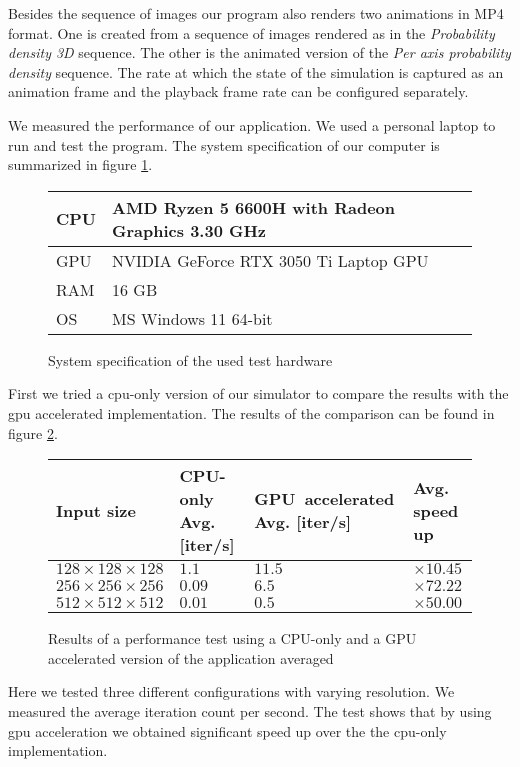 Besides the sequence of images our program also renders two animations in MP4 format.
One is created from a sequence of images rendered as in the \textit{Probability density 3D} sequence.
The other is the animated version of the \textit{Per axis probability density} sequence.
The rate at which the state of the simulation is captured as an animation frame and the playback frame rate can be configured separately.

We measured the performance of our application.
We used a personal laptop to run and test the program.
The system specification of our computer is summarized in figure \ref{fig:system_spec}.
\begin{figure}
	\begin{center}
		\begin{tabular}{|m{5em}||m{25em}|}
			\hline
			CPU & AMD Ryzen 5 6600H with Radeon Graphics            3.30 GHz\\
			\hline
			GPU & NVIDIA GeForce RTX 3050 Ti Laptop GPU\\		
			\hline
			RAM & 16 GB\\		
			\hline
			OS & MS Windows 11 64-bit\\		
			\hline
		\end{tabular}
		\caption{System specification of the used test hardware}
		\label{fig:system_spec}
	\end{center}
\end{figure}
First we tried a \acrshort{cpu}-only version of our simulator to compare the results with the \acrshort{gpu} accelerated implementation.
The results of the comparison can be found in figure \ref{fig:performance_test}.
\begin{figure}
	\begin{center}
	\begin{tabular}{|m{8em}||m{8em}| m{8em}| m{4em}|}
		\hline
		Input size & CPU-only Avg. [iter/s] & GPU~accelerated Avg. [iter/s] & Avg. speed up\\
		\hline
		$128 \times 128 \times 128$ & $1.1$ & $11.5$ & $\times 10.45$\\
		\hline
		$256 \times 256 \times 256$ & $0.09$ & $6.5$ & $\times 72.22$\\
		\hline
		$512 \times 512 \times 512$ & $0.01$ & $0.5$ & $\times 50.00$\\
		\hline
	\end{tabular}
	\caption{Results of a performance test using a CPU-only and a GPU accelerated version of the application averaged}
	\label{fig:performance_test}
\end{center}
\end{figure}
Here we tested three different configurations with varying resolution.
We measured the average iteration count per second.
The test shows that by using \acrshort{gpu} acceleration we obtained significant speed up over the the \acrshort{cpu}-only implementation.






